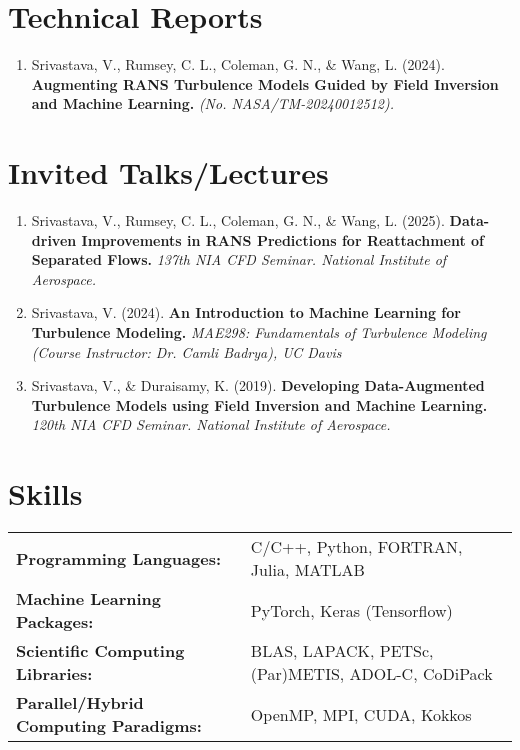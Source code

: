 \documentclass[letterpaper, 11pt]{article}
\begin{document}
  \section{Technical Reports}
  {
    \small
    \begin{enumerate}
      \item
      Srivastava, V., Rumsey, C. L., Coleman, G. N., \& Wang, L. (2024).%
      \textbf{
        Augmenting RANS Turbulence Models Guided by Field Inversion and Machine Learning.%
      }\textit{
        (No. NASA/TM-20240012512).
      }
    \end{enumerate}
  }

  \section{Invited Talks/Lectures}
  {
    \small
    \begin{enumerate}
      \item
      Srivastava, V., Rumsey, C. L., Coleman, G. N., \& Wang, L. (2025).%
      \textbf{
        Data-driven Improvements in RANS Predictions for Reattachment of Separated Flows.%
      }\textit{
        137th NIA CFD Seminar. National Institute of Aerospace.
      }

      \item
      Srivastava, V. (2024).%
      \textbf{
        An Introduction to Machine Learning for Turbulence Modeling.%
      }\textit{
        MAE298: Fundamentals of Turbulence Modeling (Course Instructor: Dr. Camli Badrya), UC Davis
      }

      \item
      Srivastava, V., \& Duraisamy, K. (2019).%
      \textbf{
        Developing Data-Augmented Turbulence Models using Field Inversion and Machine Learning.%
      }\textit{
        120th NIA CFD Seminar. National Institute of Aerospace.
      }
    \end{enumerate}
  }

  \section{Skills}
  {
    \small
    \begin{center}
    \begin{tabular*}{0.97\textwidth}[t]{@{\vspace{3pt}}l@{\extracolsep{10pt}}l}
      \textbf{Programming Languages:} & C/C++, Python, FORTRAN, Julia, MATLAB \\
      \textbf{Machine Learning Packages:} & PyTorch, Keras (Tensorflow) \\
      \textbf{Scientific Computing Libraries:} & BLAS, LAPACK, PETSc, (Par)METIS, ADOL-C, CoDiPack \\
      \textbf{Parallel/Hybrid Computing Paradigms:} & OpenMP, MPI, CUDA, Kokkos \\
    \end{tabular*}
    \end{center}
  }
\end{document}
